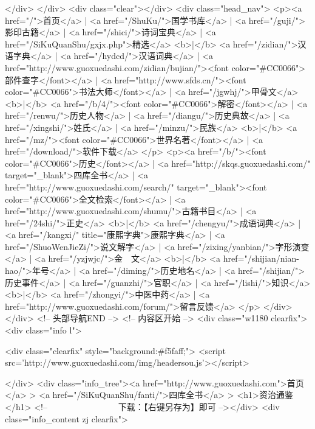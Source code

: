   </div>
</div>
  <div class="clear"></div>
  <div class="head_nav">
  <p><a href="/">首页</a> | <a href="/ShuKu/">国学书库</a> | <a href="/guji/">影印古籍</a> | <a href="/shici/">诗词宝典</a> | <a   href="/SiKuQuanShu/gxjx.php">精选</a> <b>|</b> <a href="/zidian/">汉语字典</a> | <a href="/hydcd/">汉语词典</a> | <a href="http://www.guoxuedashi.com/zidian/bujian/"><font  color="#CC0066">部件查字</font></a> | <a href="http://www.sfds.cn/"><font  color="#CC0066">书法大师</font></a> | <a href="/jgwhj/">甲骨文</a> <b>|</b> <a href="/b/4/"><font  color="#CC0066">解密</font></a> | <a href="/renwu/">历史人物</a> | <a href="/diangu/">历史典故</a> | <a href="/xingshi/">姓氏</a> | <a href="/minzu/">民族</a> <b>|</b> <a href="/mz/"><font  color="#CC0066">世界名著</font></a> | <a href="/download/">软件下载</a>
</p>
<p><a href="/b/"><font  color="#CC0066">历史</font></a> | <a href="http://skqs.guoxuedashi.com/" target="_blank">四库全书</a> |  <a href="http://www.guoxuedashi.com/search/" target="_blank"><font  color="#CC0066">全文检索</font></a> | <a href="http://www.guoxuedashi.com/shumu/">古籍书目</a> | <a   href="/24shi/">正史</a> <b>|</b> <a href="/chengyu/">成语词典</a> | <a href="/kangxi/" title="康熙字典">康熙字典</a> | <a href="/ShuoWenJieZi/">说文解字</a> | <a href="/zixing/yanbian/">字形演变</a> | <a href="/yzjwjc/">金　文</a> <b>|</b>  <a href="/shijian/nian-hao/">年号</a> | <a href="/diming/">历史地名</a> | <a href="/shijian/">历史事件</a> | <a href="/guanzhi/">官职</a> | <a href="/lishi/">知识</a> <b>|</b> <a href="/zhongyi/">中医中药</a> | <a href="http://www.guoxuedashi.com/forum/">留言反馈</a>
</p>
  </div>
</div>
<!-- 头部导航END --> 
<!-- 内容区开始 --> 
<div class="w1180 clearfix">
  <div class="info l">
   
<div class="clearfix" style="background:#f5faff;">
<script src='http://www.guoxuedashi.com/img/headersou.js'></script>

</div>
  <div class="info_tree"><a href="http://www.guoxuedashi.com">首页</a> > <a href="/SiKuQuanShu/fanti/">四库全书</a>
 > <h1>资治通鉴</h1> <!-- 　　　　　　　　下载：【右键另存为】即可 --></div>
  <div class="info_content zj clearfix">
  
